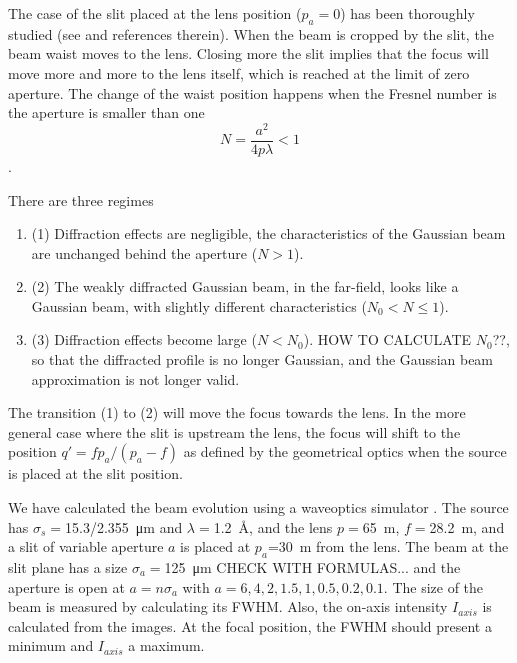 \documentclass{iucr}              %
\begin{document}
The case of the slit placed at the lens position ($p_a=0$) has been thoroughly studied (see \cite{Tanaka:85} and references therein). When the beam is cropped by the slit, the beam waist moves to the lens. Closing more the slit implies that the focus will move more and more to the lens itself, which is reached at the limit of zero aperture. The change of the waist position happens when the Fresnel number is the aperture is smaller than one
\begin{equation}
    N = \frac{a^2}{4 p \lambda}  < 1
\end{equation}. 


There are three regimes \cite{Belland:82}
\begin{enumerate}
\item 
(1) Diffraction effects are negligible, the
characteristics of the Gaussian beam are unchanged
behind the aperture ($N>1$).
\item (2) The weakly diffracted Gaussian
beam, in the far-field, looks like a Gaussian beam, with slightly different characteristics ($N_0<N \le 1$).
\item (3) Diffraction effects become large ($N<N_0$). HOW TO CALCULATE $N_0$??, so that
the diffracted profile is no longer Gaussian, and the Gaussian beam approximation is not longer valid.
\end{enumerate}

The transition (1) to (2) will move the focus towards the lens. In the more general case where the slit is upstream the lens, the focus will shift to the position $q'=f p_a/(p_a-f)$ as defined by the geometrical optics when the source is placed at the slit position.
 
%
We have calculated the beam evolution using a waveoptics simulator \cite{wofry}. The source has $\sigma_s=$\SI{15.3/2.355}{\micro\meter} and $\lambda=$\SI{1.2}{\AA}, and the lens $p=$\SI{65}{\meter}, $f=$\SI{28.2}{\meter}, and a slit of variable aperture $a$ is placed at $p_a$=\SI{30}{\meter} from the lens. The beam at the slit plane has a size $\sigma_a=$\SI{125}{\micro\meter} CHECK WITH FORMULAS... and the aperture is open at $a = n \sigma_a$ with $a=6,4,2,1.5,1,0.5,0.2,0.1$. The size of the beam is measured by calculating its FWHM. Also, the on-axis intensity $I_{axis}$ is calculated from the images. At the focal position, the FWHM should present a minimum and $I_{axis}$ a maximum. 
 
\end{document}
